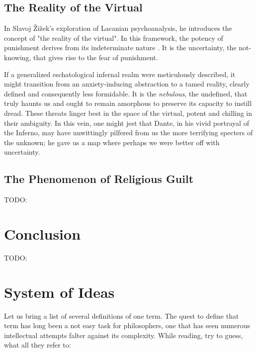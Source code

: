 \documentclass[11pt,a4]{article}
\begin{document}
    \subsection{The Reality of the Virtual}
         
        In Slavoj Žižek's exploration of Lacanian psychoanalysis, he introduces the concept of "the reality of the virtual".
        In this framework, the potency of punishment derives from its indeterminate nature \cite{Borretzen2012-tx}. It is the uncertainty, the not-knowing, that gives rise to the fear of punishment. 
       
        \par
        If a generalized eschatological infernal realm were meticulously described, it might transition from an anxiety-inducing abstraction to a tamed reality, clearly defined and consequently less formidable. It is the \textit{nebulous}, the undefined, that truly haunts us and ought to remain amorphous to preserve its capacity to instill dread. These threats linger best in the space of the virtual, potent and chilling in their ambiguity. In this vein, one might jest that Dante, in his vivid portrayal of the Inferno, may have unwittingly pilfered from us the more terrifying specters of the unknown; he gave us a map where perhaps we were better off with uncertainty.
        

    \subsection{The Phenomenon of Religious Guilt}
        TODO:
        
\section{Conclusion}
    TODO:




 
\section{System of Ideas}
Let us bring a list of several definitions of one term. The quest to define that term has long been a not easy task for philosophers, one that has seen numerous intellectual attempts falter against its complexity. 
While reading, try to guess, what all they refer to:  
\end{document}
